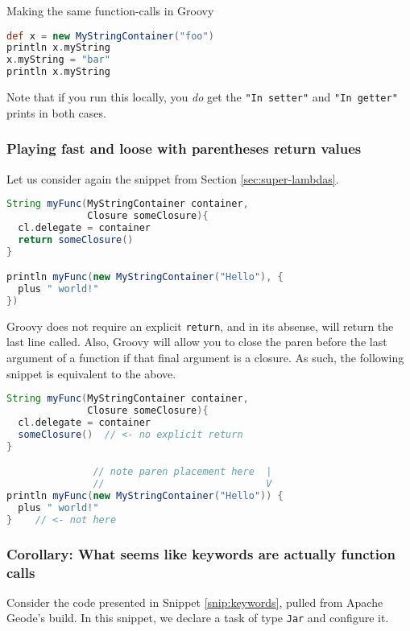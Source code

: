 \documentclass[]{article}
\theoremstyle{definition}
\begin{document}
Making the same function-calls in Groovy
\begin{lstlisting}[language=Groovy]
def x = new MyStringContainer("foo")
println x.myString
x.myString = "bar"
println x.myString
\end{lstlisting}

Note that if you run this locally, you \emph{do} get
  the \texttt{"In setter"} and \texttt{"In getter"} prints in both cases.

\subsubsection{Playing fast and loose with parentheses return values}

Let us consider again the snippet from Section \ref{sec:super-lambdas}.

\begin{lstlisting}[language=Groovy]
String myFunc(MyStringContainer container,
              Closure someClosure){
  cl.delegate = container
  return someClosure()
}

println myFunc(new MyStringContainer("Hello"), {
  plus " world!"
})
\end{lstlisting}

Groovy does not require an explicit \texttt{return}, and in its absense, will return the last
  line called.
Also, Groovy will allow you to close the paren before the last argument of a function if that
  final argument is a closure.
As such, the following snippet is equivalent to the above.

\begin{lstlisting}[language=Groovy]
String myFunc(MyStringContainer container,
              Closure someClosure){
  cl.delegate = container
  someClosure()  // <- no explicit return
}

               // note paren placement here  |
               //                            V
println myFunc(new MyStringContainer("Hello")) {
  plus " world!"
}    // <- not here
\end{lstlisting}

\subsubsection{Corollary: What seems like keywords are actually function calls}

Consider the code presented in Snippet \ref{snip:keywords}, pulled from Apache Geode's build.
In this snippet, we declare a task of type \texttt{Jar} and configure it.
\end{document}
